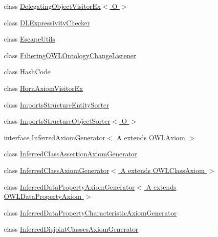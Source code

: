 \begin{DoxyCompactItemize}
class \hyperlink{classorg_1_1semanticweb_1_1owlapi_1_1util_1_1_delegating_object_visitor_ex_3_01_o_01_4}{Delegating\-Object\-Visitor\-Ex$<$ O $>$}
\item 
class \hyperlink{classorg_1_1semanticweb_1_1owlapi_1_1util_1_1_d_l_expressivity_checker}{D\-L\-Expressivity\-Checker}
\item 
class \hyperlink{classorg_1_1semanticweb_1_1owlapi_1_1util_1_1_escape_utils}{Escape\-Utils}
\item 
class \hyperlink{classorg_1_1semanticweb_1_1owlapi_1_1util_1_1_filtering_o_w_l_ontology_change_listener}{Filtering\-O\-W\-L\-Ontology\-Change\-Listener}
\item 
class \hyperlink{classorg_1_1semanticweb_1_1owlapi_1_1util_1_1_hash_code}{Hash\-Code}
\item 
class \hyperlink{classorg_1_1semanticweb_1_1owlapi_1_1util_1_1_horn_axiom_visitor_ex}{Horn\-Axiom\-Visitor\-Ex}
\item 
class \hyperlink{classorg_1_1semanticweb_1_1owlapi_1_1util_1_1_imports_structure_entity_sorter}{Imports\-Structure\-Entity\-Sorter}
\item 
class \hyperlink{classorg_1_1semanticweb_1_1owlapi_1_1util_1_1_imports_structure_object_sorter_3_01_o_01_4}{Imports\-Structure\-Object\-Sorter$<$ O $>$}
\item 
interface \hyperlink{interfaceorg_1_1semanticweb_1_1owlapi_1_1util_1_1_inferred_axiom_generator_3_01_a_01extends_01_o_w_l_axiom_01_4}{Inferred\-Axiom\-Generator$<$ A extends O\-W\-L\-Axiom $>$}
\item 
class \hyperlink{classorg_1_1semanticweb_1_1owlapi_1_1util_1_1_inferred_class_assertion_axiom_generator}{Inferred\-Class\-Assertion\-Axiom\-Generator}
\item 
class \hyperlink{classorg_1_1semanticweb_1_1owlapi_1_1util_1_1_inferred_class_axiom_generator_3_01_a_01extends_01_o_w_l_class_axiom_01_4}{Inferred\-Class\-Axiom\-Generator$<$ A extends O\-W\-L\-Class\-Axiom $>$}
\item 
class \hyperlink{classorg_1_1semanticweb_1_1owlapi_1_1util_1_1_inferred_data_property_axiom_generator_3_01_a_01exbfc5b704ea6b718e158918a5652c43f4}{Inferred\-Data\-Property\-Axiom\-Generator$<$ A extends O\-W\-L\-Data\-Property\-Axiom $>$}
\item 
class \hyperlink{classorg_1_1semanticweb_1_1owlapi_1_1util_1_1_inferred_data_property_characteristic_axiom_generator}{Inferred\-Data\-Property\-Characteristic\-Axiom\-Generator}
\item 
class \hyperlink{classorg_1_1semanticweb_1_1owlapi_1_1util_1_1_inferred_disjoint_classes_axiom_generator}{Inferred\-Disjoint\-Classes\-Axiom\-Generator}

\end{DoxyCompactItemize}
